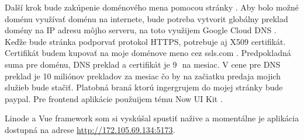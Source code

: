 Další krok bude zakúpenie doménového mena pomocou stránky \cite{domain}. Aby bolo možné doménu využívať doménu na internete, bude potreba vytvorit globálny preklad domény na IP adresu môjho serveru, na toto využijem Google Cloud DNS \cite{dns}. Keďže bude stránka podporvať protokol HTTPS, potrebuje aj X509 certifikát. Certifikát budem kupovať na moje doménove meno cez ssls.com \cite{cert}. Predpokladná suma pre doménu, DNS preklad a certifikát je 9\,\texteuro~na mesiac. V cene pre DNS preklad je 10 miliónov prekladov za mesiac čo by na začiatku predaja mojich služieb bude stačiť. Platobná braná ktorú ingergrujem do mojej stránky bude paypal. Pre frontend aplikácie použuijem tému Now UI Kit \cite{vue_kit}.

Linode a Vue framework som si vyskúšal spustiť nažive a momentálne je aplikácia dostupná na adrese \url{http://172.105.69.134:5173}.